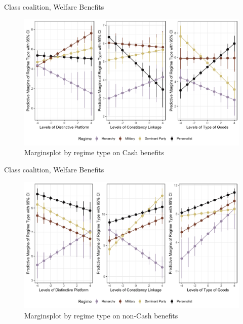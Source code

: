 \documentclass{Bredelebeamer}
\begin{document}
\begin{frame}{Class coalition, Welfare Benefits}
\begin{figure}
	\centering
	\includegraphics[width=\linewidth]{"../4. Figures/margins1"}
	\caption{Marginsplot by regime type on Cash benefits}
	\label{fig:marginscash}
\end{figure}
\end{frame}

\begin{frame}{Class coalition, Welfare Benefits}
	\begin{figure}
		\centering
		\includegraphics[width=\linewidth]{"../4. Figures/margins2"}
		\caption{Marginsplot by regime type on non-Cash benefits}
		\label{fig:marginsnon}
	\end{figure}
\end{frame}
\end{document}
